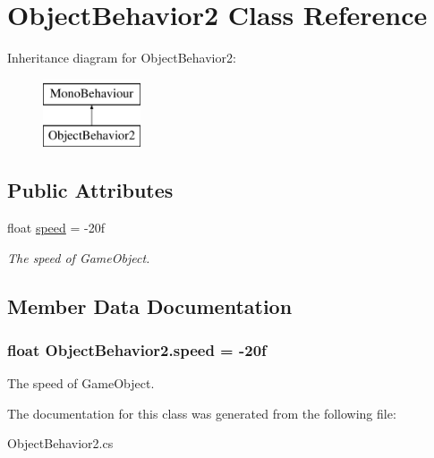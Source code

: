 \hypertarget{classObjectBehavior2}{\section{Object\-Behavior2 Class Reference}
\label{classObjectBehavior2}
}
Inheritance diagram for Object\-Behavior2\-:\begin{figure}[H]
\begin{center}
\leavevmode
\includegraphics[height=2.000000cm]{classObjectBehavior2}
\end{center}
\end{figure}
\subsection*{Public Attributes}
\begin{DoxyCompactItemize}
\item 
float \hyperlink{classObjectBehavior2_a71c5a332d63c4fc276f53480f86f0641}{speed} = -\/20f
\begin{DoxyCompactList}\small\item\em The speed of Game\-Object. \end{DoxyCompactList}\end{DoxyCompactItemize}


\subsection{Member Data Documentation}
\hypertarget{classObjectBehavior2_a71c5a332d63c4fc276f53480f86f0641}{
\subsubsection[{speed}]{\setlength{\rightskip}{0pt plus 5cm}float Object\-Behavior2.\-speed = -\/20f}}\label{classObjectBehavior2_a71c5a332d63c4fc276f53480f86f0641}


The speed of Game\-Object. 



The documentation for this class was generated from the following file\-:\begin{DoxyCompactItemize}
\item 
Object\-Behavior2.\-cs\end{DoxyCompactItemize}
